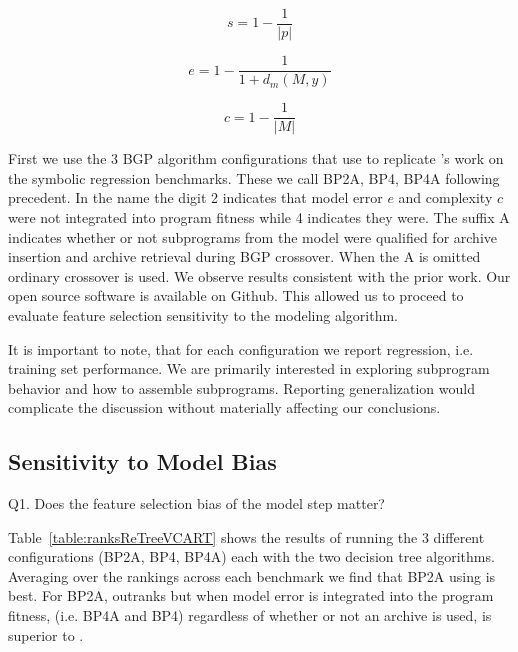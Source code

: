 \begin{equation}
\label{eq:s}
s = 1 - \frac{1}{|p|}
\end{equation}

\begin{equation}
\label{eq:e}
e = 1 - \frac{1}{1 + d_{m}(M, y)}
\end{equation}

\begin{equation}
\label{eq:c}
c = 1 - \frac{1}{|M|}
\end{equation}

First we use the 3 BGP algorithm configurations that use \REPTREE to replicate \cite{krawiecGecco2014}'s work on the symbolic regression benchmarks. These we call BP2A, BP4, BP4A following precedent. In the name the digit 2 indicates that model error $e$ and complexity $c$ were not integrated into program fitness while 4 indicates they were.   The suffix A indicates whether or not subprograms from the model were qualified for archive insertion and archive retrieval during BGP crossover. When the A is omitted ordinary crossover is used. We observe results consistent with the prior work. Our open source software is available on Github.
This allowed us to proceed to evaluate feature selection sensitivity to the modeling algorithm.

It is important to note, that for each configuration we report regression, i.e. training set performance. We are primarily interested in exploring subprogram behavior and how to assemble subprograms. Reporting generalization would complicate the discussion without materially affecting our conclusions. 

\subsection{Sensitivity to Model Bias}\label{sect:ftr-select}

Q1. Does the feature selection bias of the model step matter? 



Table~\ref{table:ranksReTreeVCART} shows the results of running the 3 different configurations (BP2A, BP4, BP4A) each with the two decision tree algorithms.  Averaging over the rankings across each benchmark we find that BP2A using \REPTREE is best. For BP2A, \REPTREE outranks \SCIKIT but when model error is integrated into the program fitness, (i.e. BP4A and BP4) regardless of whether or not an archive is used, \SCIKIT is superior to \REPTREE.  

